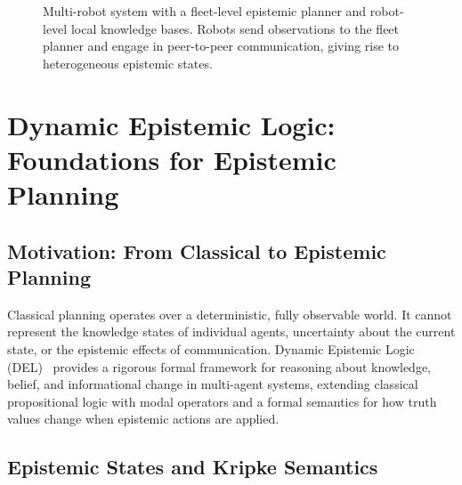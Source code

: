 \documentclass[12pt,a4paper]{article}
\theoremstyle{definition}
\theoremstyle{plain}
\begin{document}
\begin{figure}[H]
\caption{Multi-robot system with a fleet-level epistemic planner and robot-level local knowledge
bases. Robots send observations to the fleet planner and engage in peer-to-peer communication,
giving rise to heterogeneous epistemic states.}
\label{fig:multirobot}
\end{figure}


\newpage
\section{Dynamic Epistemic Logic: Foundations for Epistemic Planning}
\label{sec:del}


\subsection{Motivation: From Classical to Epistemic Planning}

Classical planning operates over a deterministic, fully observable world. It cannot represent
the knowledge states of individual agents, uncertainty about the current state, or the epistemic
effects of communication. Dynamic Epistemic Logic (DEL)~\cite{baltag1998logic, vanditmarsch2007}
provides a rigorous formal framework for reasoning about knowledge, belief, and informational
change in multi-agent systems, extending classical propositional logic with modal operators and
a formal semantics for how truth values change when epistemic actions are applied.

\subsection{Epistemic States and Kripke Semantics}
\end{document}
